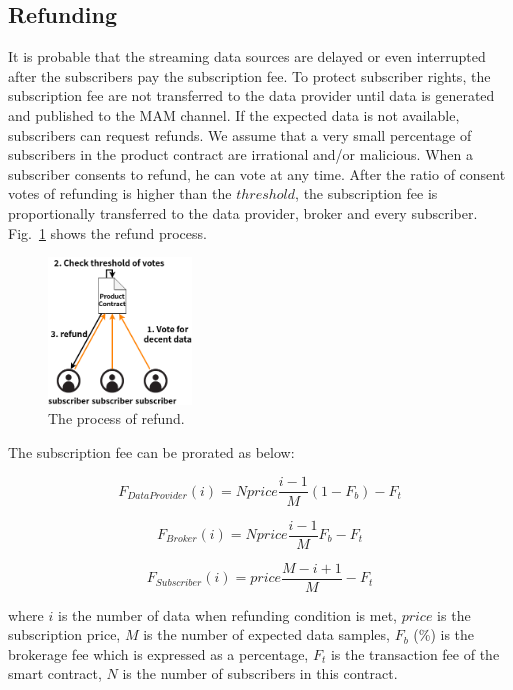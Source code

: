 \documentclass[conference]{IEEEtran}
\begin{document}
\subsection{Refunding}

It is probable that the streaming data sources are delayed or even interrupted after the subscribers pay the subscription fee. To protect subscriber rights, the subscription fee are not transferred to the data provider until data is generated and published to the MAM channel. If the expected data is not available, subscribers can request refunds. We assume that a very small percentage of subscribers in the product contract are irrational and/or malicious. When a subscriber consents to refund, he can vote at any time. After the ratio of consent votes of refunding is higher than the $threshold$, the subscription fee is proportionally transferred to the data provider, broker and every subscriber. Fig.~\ref{fig:refund} shows the refund process.

\begin{figure}[!t]
	\centering
	\includegraphics[width=1.5in]{refund}
	\caption{The process of refund.}
	\label{fig:refund}
\end{figure}

The subscription fee can be prorated as below:

\begin{equation}
    F_{DataProvider}(i) = N price \frac{i-1}{M} (1-F_{b}) -F_{t}
\end{equation}

\begin{equation}
    F_{Broker}(i) = N price \frac{i-1}{M} F_{b} -F_{t}
\end{equation}

\begin{equation}
    F_{Subscriber}(i) = price \frac{M-i+1}{M} -F_{t}
\end{equation}

where $i$ is the number of data when refunding condition is met, $price$  is the subscription price, $M$ is the number of expected data samples, $F_{b}$ (\%) is the brokerage fee which is expressed as a percentage, $F_{t}$ is the transaction fee of the smart contract, $N$ is the number of subscribers in this contract.
\end{document}

